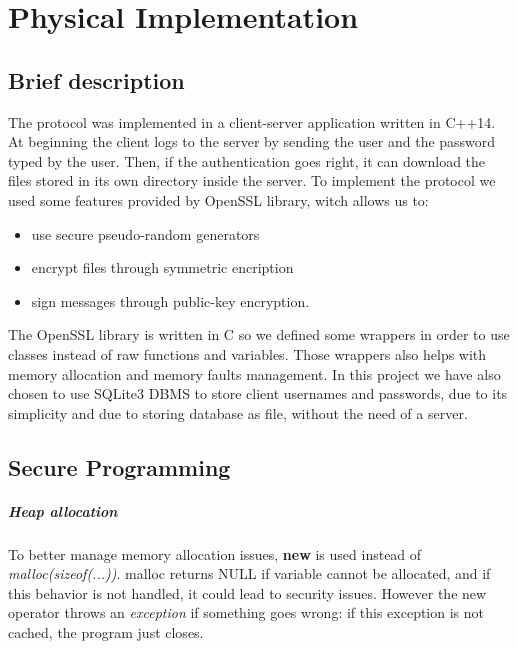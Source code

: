 \chapter{Physical Implementation}
\section{Brief description}
\par The protocol was implemented in a client-server application written in C++14. At beginning the client logs to the server by sending the user and the password typed by the user. Then, if the authentication goes right, it can download the files stored in its own directory inside the server. To implement the protocol we used some features provided by OpenSSL library, witch allows us to:
\begin{itemize}
	\item use secure pseudo-random generators
	\item encrypt files through symmetric encription
	\item sign messages through public-key encryption.
\end{itemize}
The OpenSSL library is written in C so we defined some wrappers in order to use classes instead of raw functions and variables. Those wrappers also helps with memory allocation and memory faults management.
In this project we have also chosen to use SQLite3 DBMS to store client usernames and passwords, due to its simplicity and due to storing database as file, without the need of a server.

\section{Secure Programming}
\paragraph{Heap allocation}
To better manage memory allocation issues, \textbf{new} is used instead of \textit{malloc(sizeof(...))}. malloc returns NULL if variable cannot be allocated, and if this behavior is not handled, it could lead to security issues. However the new operator throws an \textit{exception} if something goes wrong: if this exception is not cached, the program just closes.

